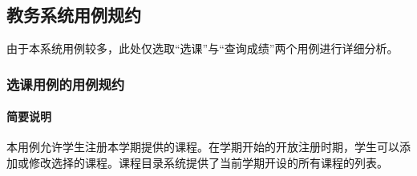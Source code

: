 \subsection{教务系统用例规约}

由于本系统用例较多，此处仅选取“选课”与“查询成绩”两个用例进行详细分析。

\subsubsection{选课用例的用例规约}

\paragraph{简要说明}
  
本用例允许学生注册本学期提供的课程。在学期开始的开放注册时期，学生可以添加或修改选择的课程。课程目录系统提供了当前学期开设的所有课程的列表。
  
